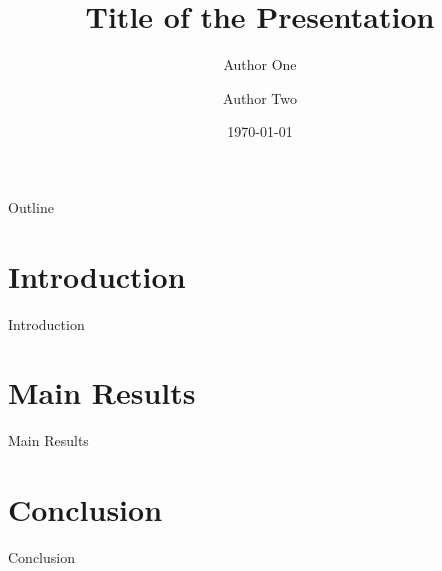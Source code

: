 \documentclass{beamer}
\title{Title of the Presentation}
\author{Author One \and Author Two}
\institute{University}
\date{\today}
\begin{document}
\begin{frame}
\titlepage
\end{frame}

\begin{frame}{Outline}
\tableofcontents
\end{frame}

\section{Introduction}

\begin{frame}{Introduction}
\end{frame}

\section{Main Results}

\begin{frame}{Main Results}
\end{frame}

\section{Conclusion}

\begin{frame}{Conclusion}
\end{frame}
\end{document}
